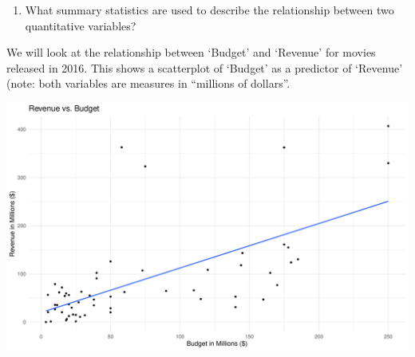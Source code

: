 \documentclass[
]{report}
\newenvironment{Shaded}{\begin{snugshade}}{\end{snugshade}}
\newcommand{\CommentTok}[1]{\textcolor[rgb]{0.56,0.35,0.01}{\textit{#1}}}
\newcommand{\DataTypeTok}[1]{\textcolor[rgb]{0.13,0.29,0.53}{#1}}
\newcommand{\KeywordTok}[1]{\textcolor[rgb]{0.13,0.29,0.53}{\textbf{#1}}}
\newcommand{\NormalTok}[1]{#1}
\newcommand{\OperatorTok}[1]{\textcolor[rgb]{0.81,0.36,0.00}{\textbf{#1}}}
\newcommand{\OtherTok}[1]{\textcolor[rgb]{0.56,0.35,0.01}{#1}}
\newcommand{\StringTok}[1]{\textcolor[rgb]{0.31,0.60,0.02}{#1}}
\providecommand{\tightlist}{%
  \setlength{\itemsep}{0pt}\setlength{\parskip}{0pt}}
\begin{document}
\vspace{0.2in}

\begin{enumerate}
\def\labelenumi{\arabic{enumi}.}
\setcounter{enumi}{1}
\tightlist
\item
  What summary statistics are used to describe the relationship between two quantitative variables?
\end{enumerate}

\vspace{0.3in}

We will look at the relationship between `Budget' and `Revenue' for movies released in 2016. This shows a scatterplot of `Budget' as a predictor of `Revenue' (note: both variables are measures in ``millions of dollars''.

\begin{Shaded}
\end{Shaded}

\begin{center}\includegraphics[width=0.7\linewidth]{05-EDA-multivariate_files/figure-latex/unnamed-chunk-2-1} \end{center}
\end{document}
